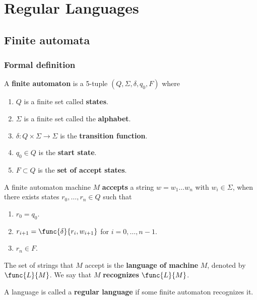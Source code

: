 \chapter{Regular Languages}

\section{Finite automata}
\subsection{Formal definition}
\begin{definition}
    A \textbf{finite automaton} is a 5-tuple \((Q,\Sigma, \delta, q_0, F)\) where
    \begin{enumerate}
        \item \(Q\) is a finite set called \textbf{states}.
        \item \(\Sigma\) is a finite set called the \textbf{alphabet}.
        \item \(\delta: Q \times \Sigma \to \Sigma\) is the \textbf{transition function}.
        \item \(q_0 \in Q\) is the \textbf{start state}.
        \item \(F \subset Q\) is the \textbf{set of accept states}.
    \end{enumerate}
\end{definition}
A finite automaton machine \(M\) \textbf{accepts} a string \(w = w_1\dots w_n\) with \(w_i \in \Sigma\), when there exists states \(r_0 , \dots , r_n \in Q\) such that 
\begin{enumerate}
    \item \(r_0 = q_0\).
    \item \(r_{i+1} = \func{\delta}{r_i, w_{i+1}}\) for \(i = 0, \dots, n-1\).
    \item \(r_n \in F\).
\end{enumerate}
The set of strings that \(M\) accept is the \textbf{language of machine} \(M\), denoted by \(\func{L}{M}\). We say that \(M\) \textbf{recognizes} \(\func{L}{M}\).

\begin{definition}
    A language is called a \textbf{regular language} if some finite automaton recognizes it.
\end{definition}

